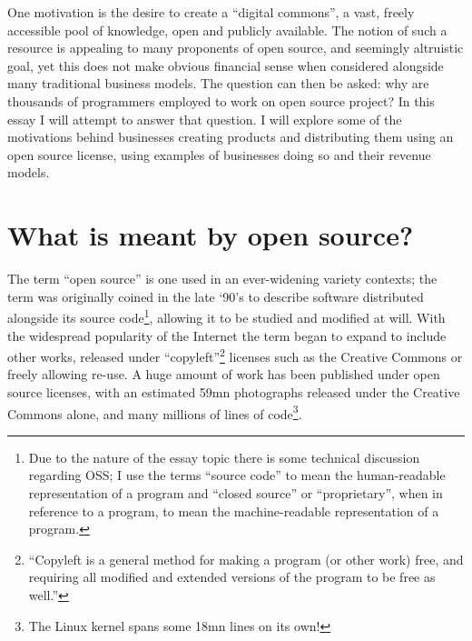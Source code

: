 \documentclass[a4paper]{article}
\begin{document}
One motivation is the desire to create a “digital commons”, a vast, freely accessible pool of knowledge, open and publicly available. The notion of such a resource is appealing to many proponents of open source\cite{fsf}, and seemingly altruistic goal, yet this does not make obvious financial sense when considered alongside many traditional business models. The question can then be asked: why are thousands of programmers employed to work on open source project\cite{ibmlinux}\cite{mozillacrisis}? In this essay I will attempt to answer that question. I will explore some of the motivations behind businesses creating products and distributing them using an open source license, using examples of businesses doing so and their revenue models.

\section{What is meant by open source?}

The term “open source” is one used in an ever-widening variety contexts; the term was originally coined in the late ‘90’s\cite{osihistory} to describe software distributed alongside its source code\footnote{Due to the nature of the essay topic there is some technical discussion regarding OSS; I use the terms “source code” to mean the human-readable representation of a program and “closed source” or “proprietary”, when in reference to a program, to mean the machine-readable representation of a program.}, allowing it to be studied and modified at will. With the widespread popularity of the Internet the term began to expand to include other works, released under “copyleft”\footnote{“Copyleft is a general method for making a program (or other work) free, and requiring all modified and extended versions of the program to be free as well.”\cite{copyleft}} licenses such as the Creative Commons\cite{cc} or freely allowing re-use. A huge amount of work has been published under open source licenses, with an estimated 59mn\cite{ccdir} photographs released under the Creative Commons alone, and many millions of lines of code\footnote{The Linux kernel spans some 18mn lines on its own!\cite{linuxkernel}}.
\end{document}
